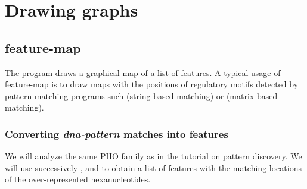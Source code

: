 \chapter{Drawing graphs}


\section{feature-map}

The program  draws a graphical map of a list of
features. A typical usage of feature-map is to draw maps with the
positions of regulatory motifs detected by pattern matching programs
such  (string-based matching) or 
(matrix-based matching).

\subsection{Converting \textit{dna-pattern} matches into features}

We will analyze the same PHO family as in the tutorial on pattern
discovery. We will use successively ,
 and  to obtain a
list of features with the matching locations of the over-represented
hexanucleotides.


